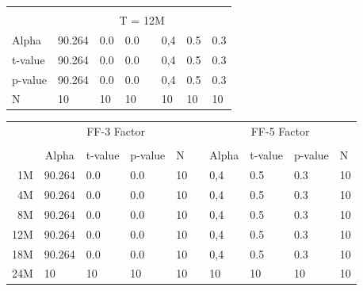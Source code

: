 \begin{table}[]
\begin{tabular}{llllllll}
          &            &         &          &  &           &          &          \\
          & \multicolumn{7}{c}{T = 12M}                                          \\ \hline
Alpha     & 90.264     & 0.0     & 0.0      &  & 0,4       & 0.5      & 0.3      \\
t-value   & 90.264     & 0.0     & 0.0      &  & 0,4       & 0.5      & 0.3      \\
p-value   & 90.264     & 0.0     & 0.0      &  & 0,4       & 0.5      & 0.3      \\
N         & 10         & 10      & 10       &  & 10        & 10       & 10       \\ \hline
\end{tabular}
\end{table}




\begin{table}[]
\begin{tabular}{rlllllllll}
\hline \hline
\textbf{} & \multicolumn{4}{c}{FF-3 Factor}                    &  & \multicolumn{4}{c}{FF-5 Factor} \\ \cline{2-5} \cline{7-10} 
          &                           &         &         &    &  &        &         &         &    \\
          & \multicolumn{1}{c}{Alpha} & t-value & p-value & N  &  & Alpha  & t-value & p-value & N  \\ \hline
1M        & 90.264                    & 0.0     & 0.0     & 10 &  & 0,4    & 0.5     & 0.3     & 10 \\
4M        & 90.264                    & 0.0     & 0.0     & 10 &  & 0,4    & 0.5     & 0.3     & 10 \\
8M        & 90.264                    & 0.0     & 0.0     & 10 &  & 0,4    & 0.5     & 0.3     & 10 \\
12M       & 90.264                    & 0.0     & 0.0     & 10 &  & 0,4    & 0.5     & 0.3     & 10 \\
18M       & 90.264                    & 0.0     & 0.0     & 10 &  & 0,4    & 0.5     & 0.3     & 10 \\
24M       & 10                        & 10      & 10      & 10 &  & 10     & 10      & 10      & 10 \\
\hline \hline 

\end{tabular}
\end{table}